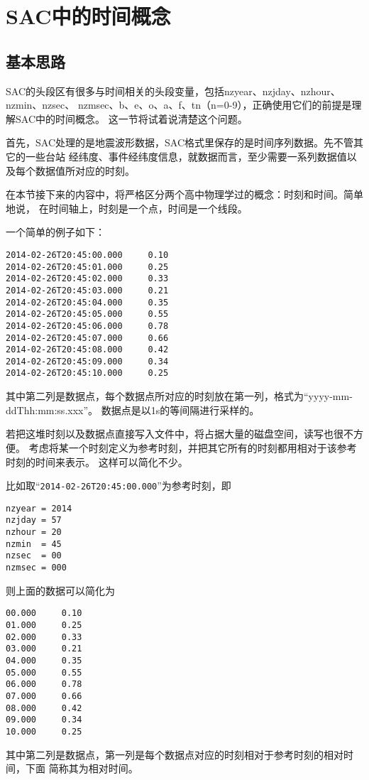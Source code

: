 \section{SAC中的时间概念}
\label{sec:sac-time}

\subsection{基本思路}
SAC的头段区有很多与时间相关的头段变量，包括nzyear、nzjday、nzhour、nzmin、nzsec、
nzmsec、b、e、o、a、f、tn（n=0-9），正确使用它们的前提是理解SAC中的时间概念。
这一节将试着说清楚这个问题。

首先，SAC处理的是地震波形数据，SAC格式里保存的是时间序列数据。先不管其它的一些台站
经纬度、事件经纬度信息，就数据而言，至少需要一系列数据值以及每个数据值所对应的时刻。

在本节接下来的内容中，将严格区分两个高中物理学过的概念：时刻和时间。简单地说，
在时间轴上，时刻是一个点，时间是一个线段。

一个简单的例子如下：
\begin{verbatim}
2014-02-26T20:45:00.000     0.10
2014-02-26T20:45:01.000     0.25
2014-02-26T20:45:02.000     0.33
2014-02-26T20:45:03.000     0.21
2014-02-26T20:45:04.000     0.35
2014-02-26T20:45:05.000     0.55
2014-02-26T20:45:06.000     0.78
2014-02-26T20:45:07.000     0.66
2014-02-26T20:45:08.000     0.42
2014-02-26T20:45:09.000     0.34
2014-02-26T20:45:10.000     0.25
\end{verbatim}
其中第二列是数据点，每个数据点所对应的时刻放在第一列，格式为``yyyy-mm-ddThh:mm:ss.xxx''。
数据点是以1s的等间隔进行采样的。

若把这堆时刻以及数据点直接写入文件中，将占据大量的磁盘空间，读写也很不方便。
考虑将某一个时刻定义为参考时刻，并把其它所有的时刻都用相对于该参考时刻的时间来表示。
这样可以简化不少。

比如取``\verb+2014-02-26T20:45:00.000+''为参考时刻，即
\begin{verbatim}
nzyear = 2014
nzjday = 57
nzhour = 20
nzmin  = 45
nzsec  = 00
nzmsec = 000
\end{verbatim}
则上面的数据可以简化为
\begin{verbatim}
00.000     0.10
01.000     0.25
02.000     0.33
03.000     0.21
04.000     0.35
05.000     0.55
06.000     0.78
07.000     0.66
08.000     0.42
09.000     0.34
10.000     0.25
\end{verbatim}
其中第二列是数据点，第一列是每个数据点对应的时刻相对于参考时刻的相对时间，下面
简称其为相对时间。

